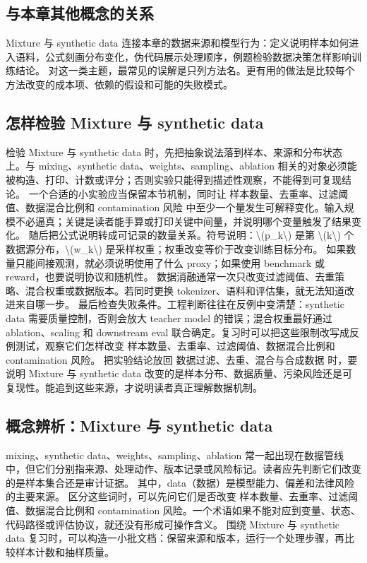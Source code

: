 \documentclass[a4paper]{article}
\begin{document}
\subsection{与本章其他概念的关系}
Mixture 与 synthetic data 连接本章的数据来源和模型行为：定义说明样本如何进入语料，公式刻画分布变化，伪代码展示处理顺序，例题检验数据决策怎样影响训练结论。
对这一类主题，最常见的误解是只列方法名。更有用的做法是比较每个方法改变的成本项、依赖的假设和可能的失败模式。
\subsection{怎样检验 Mixture 与 synthetic data}
检验 Mixture 与 synthetic data 时，先把抽象说法落到样本、来源和分布状态上。与 mixing、synthetic data、weights、sampling、ablation 相关的对象必须能被构造、打印、计数或评分；否则实验只能得到描述性观察，不能得到可复现结论。
一个合适的小实验应当保留本节机制，同时让 样本数量、去重率、过滤阈值、数据混合比例和 contamination 风险 中至少一个量发生可解释变化。输入规模不必逼真；关键是读者能手算或打印关键中间量，并说明哪个变量触发了结果变化。
随后把公式说明转成可记录的数量关系。符号说明：\textbackslash{}(p\_k\textbackslash{}) 是第 \textbackslash{}(k\textbackslash{}) 个数据源分布，\textbackslash{}(w\_k\textbackslash{}) 是采样权重；权重改变等价于改变训练目标分布。 如果数量只能间接观测，就必须说明使用了什么 proxy；如果使用 benchmark 或 reward，也要说明协议和随机性。
数据消融通常一次只改变过滤阈值、去重策略、混合权重或数据版本。若同时更换 tokenizer、语料和评估集，就无法知道改进来自哪一步。
最后检查失败条件。工程判断往往在反例中变清楚：synthetic data 需要质量控制，否则会放大 teacher model 的错误；混合权重最好通过 ablation、scaling 和 downstream eval 联合确定。复习时可以把这些限制改写成反例测试，观察它们怎样改变 样本数量、去重率、过滤阈值、数据混合比例和 contamination 风险。
把实验结论放回 数据过滤、去重、混合与合成数据 时，要说明 Mixture 与 synthetic data 改变的是样本分布、数据质量、污染风险还是可复现性。能追到这些来源，才说明读者真正理解数据机制。
\subsection{概念辨析：Mixture 与 synthetic data}
mixing、synthetic data、weights、sampling、ablation 常一起出现在数据管线中，但它们分别指来源、处理动作、版本记录或风险标记。读者应先判断它们改变的是样本集合还是审计证据。
其中，data（数据）是模型能力、偏差和法律风险的主要来源。
区分这些词时，可以先问它们是否改变 样本数量、去重率、过滤阈值、数据混合比例和 contamination 风险。一个术语如果不能对应到变量、状态、代码路径或评估协议，就还没有形成可操作含义。
围绕 Mixture 与 synthetic data 复习时，可以构造一小批文档：保留来源和版本，运行一个处理步骤，再比较样本计数和抽样质量。
\end{document}
